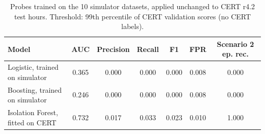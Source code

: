 \begin{table}[t]
\centering
\scriptsize
\caption{Probes trained on the 10 simulator datasets, applied unchanged to CERT r4.2 test hours. Threshold: 99th percentile of CERT validation scores (no CERT labels).}
\label{tab:simcert}
\begin{tabular}{lcccccc}
\hline
Model & AUC & Precision & Recall & F1 & FPR & Scenario 2 ep. rec. \\
\hline
Logistic, trained on simulator & 0.365 & 0.000 & 0.000 & 0.000 & 0.008 & 0.000 \\
Boosting, trained on simulator & 0.246 & 0.000 & 0.000 & 0.000 & 0.008 & 0.000 \\
Isolation Forest, fitted on CERT & 0.732 & 0.017 & 0.033 & 0.023 & 0.010 & 1.000 \\
\hline
\end{tabular}
\end{table}
